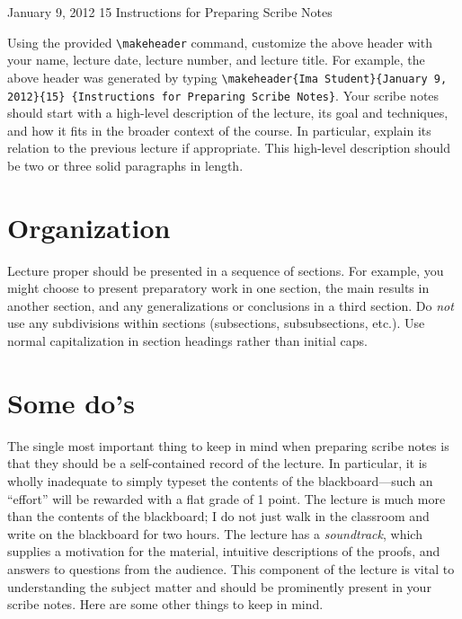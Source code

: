 \documentclass[usletter]{article}
\begin{document}
           {January 9, 2012}                          %
           {15}                                       %
           {Instructions for Preparing Scribe Notes}  %

\noindent
Using the provided \verb|\makeheader| command, 
customize the above header with your name,
lecture date, lecture number, and lecture title. For
example, the above header was generated by typing 
\verb|\makeheader{Ima Student}{January 9, 2012}{15}|{\tt 
\{Instructions for Preparing Scribe Notes\}}.  Your
scribe notes should start with a high-level description
of the lecture, its goal and techniques, and how it
fits in the broader context of the course. In
particular, explain its relation to the previous
lecture if appropriate.  This high-level description
should be two or three solid paragraphs in length.

\section{Organization}
Lecture proper should be presented in a sequence of
sections. For example, you might choose to present
preparatory work in one section, the main results in
another section, and any generalizations or conclusions
in a third section. Do \emph{not} use any subdivisions
within sections (subsections, subsubsections, etc.).
Use normal capitalization in section headings rather
than initial caps.

\section{Some do's}
The single most important thing to keep in mind when
preparing scribe notes is that they should be a
self-contained record of the lecture.  In
particular, it is wholly inadequate to simply typeset
the contents of the blackboard---such an ``effort'' will
be rewarded with a flat grade of 1 point.  The lecture
is much more than the contents of the
blackboard; I do not just walk in the classroom and
write on the blackboard for two hours. The lecture has
a \emph{soundtrack}, which supplies a motivation for
the material, intuitive descriptions of the proofs, and
answers to questions from the audience.  This component
of the lecture is vital to understanding the subject
matter and should be prominently present in your scribe
notes.  Here are some other things to keep in mind.
\end{document}
